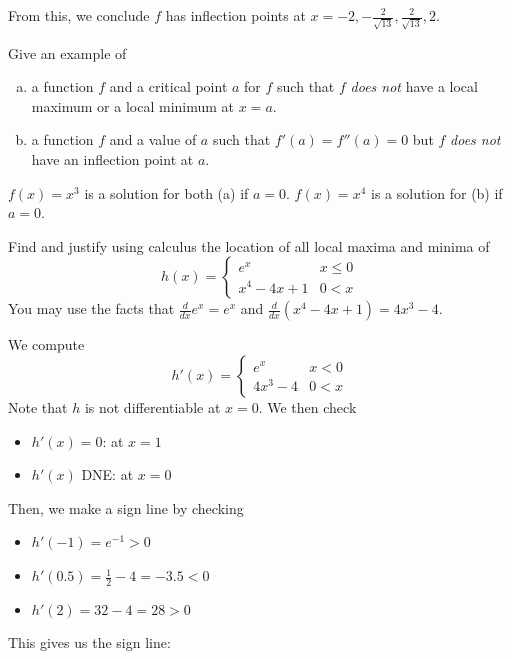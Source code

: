 \documentclass[11pt]{exam}
\begin{document}
\begin{questions}
\begin{solution}
\begin{enumerate}[(a)]
From this, we conclude \(f\) has inflection points at \(x=-2,-\frac{2}{\sqrt{13}},\frac{2}{\sqrt{13}},2\).
      \end{enumerate}
    \end{solution}
   \question Give an example of
\begin{enumerate}[(a)]
	\item a function $f$ and a critical point $a$ for $f$ such that $f$ \emph{does not} have a local maximum or a local minimum at $x=a$.
	\item a function $f$ and a value of $a$ such that $f'(a)=f''(a)=0$ but $f$ \emph{does not} have an inflection point at $a$.
\end{enumerate}
\begin{solution}
  \(f(x) = x^3\) is a solution for both (a) if \(a=0\). \(f(x) = x^4\)
  is a solution for (b) if \(a=0\).
\end{solution}
   \question Find and justify using calculus the location of all local maxima and minima of $$h(x)= \left\{
\begin{array}{ll}
      e^x & x\leq 0 \\
      x^4-4x+1& 0 < x %
\end{array} 
\right.
$$ 
You may use the facts that \(\frac{d}{dx} e^x = e^x\) and
\(\frac{d}{dx}(x^4-4x+1) = 4x^3-4\).
\begin{solution}
  We compute \[
    h'(x) =
    \begin{cases}
      e^x & x < 0\\
      4x^3 - 4 & 0 < x
    \end{cases}
  \]
  Note that \(h\) is not differentiable at \(x=0\).
  We then check
  \begin{itemize}
  \item \(h'(x) = 0\): at \(x=1\)
  \item \(h'(x)\) DNE: at \(x=0\)
  \end{itemize}
  Then, we make a sign line by checking
  \begin{itemize}
  \item \(h'(-1) = e^{-1} > 0\)
  \item \(h'(0.5) = \frac{1}{2}-4 = -3.5 < 0\)
  \item \(h'(2) = 32-4 = 28 > 0\)
  \end{itemize}
  This gives us the sign line:


\end{solution}
\end{questions}
\end{document}
